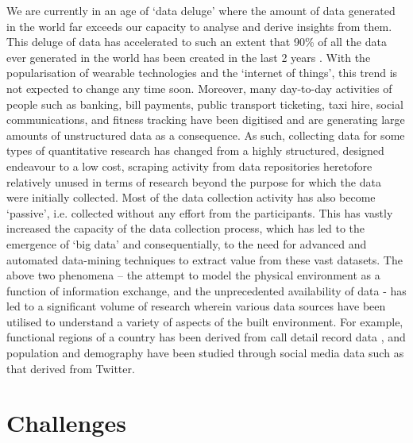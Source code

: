 We are currently in an age of `data deluge' where the amount of data generated in the world far exceeds our capacity to analyse and derive insights from them.
This deluge of data has accelerated to such an extent that 90\% of all the data ever  generated in the world has been created in the last 2 years \cite{ibm2016}.
With the popularisation of wearable technologies  and the `internet of things', this trend is not expected to change any time soon.
Moreover, many day-to-day  activities of people such  as banking, bill payments, public transport ticketing, taxi hire, social communications, and fitness tracking have been digitised and are generating large amounts of unstructured data as a consequence.
As such, collecting data for some types of quantitative research has changed from a highly structured, designed endeavour to a low cost, scraping activity from data repositories heretofore relatively unused in terms of research beyond the purpose for which the data were initially collected.
Most of the data collection activity has also become `passive', i.e. collected without any effort from the participants.
This has vastly increased the capacity of the data collection process, which has led to the emergence of `big data' and consequentially, to the need for advanced and automated data-mining techniques to extract value from these vast datasets.
The above two phenomena – the attempt to model the physical environment as a function of information exchange, and the unprecedented availability of data - has led to a significant volume of research wherein various data sources have been utilised to understand a variety of aspects of the built environment.
For example, functional regions of a country has been derived from call detail record data \cite{ratti2010}, and population and demography have been studied through social media data such as that derived from Twitter.

\section{Challenges}

